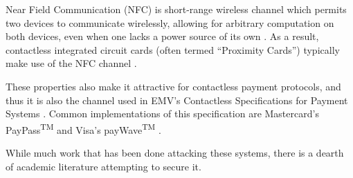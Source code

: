 Near Field Communication (NFC) is short-range wireless channel which permits two devices to communicate wirelessly,
  allowing for arbitrary computation on both devices,
  even when one lacks a power source of its own \cite{nfcspec}.
As a result, contactless integrated circuit cards (often termed ``Proximity Cards'') typically make use of the NFC channel \cite{nfciso}.

These properties also make it attractive for contactless payment protocols,
  and thus it is also the channel used in EMV's Contactless Specifications for Payment Systems \cite{emv}.
Common implementations of this specification are Mastercard's PayPass\textsuperscript{TM} \cite{paypass} and Visa's payWave\textsuperscript{TM} \cite{paywave}.

While much work that has been done attacking these systems, there is a dearth of academic literature attempting to secure it.
